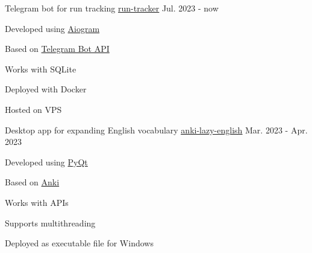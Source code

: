 
\begin{cventries}

  \cventry
  {Telegram bot for run tracking}
  {\href{https://github.com/ilev-sergey/run-tracker}{\underline{run-tracker}}}
  {}
  {Jul. 2023 - now}
  {
    \begin{cvitems}
      \item {Developed using \href{https://docs.aiogram.dev}{Aiogram}}
      \item {Based on \href{https://core.telegram.org/bots/api}{Telegram Bot API}}
      \item {Works with SQLite}
      \item {Deployed with Docker}
      \item {Hosted on VPS}
    \end{cvitems}
  }

  \cventry
  {Desktop app for expanding English vocabulary}
  {\href{https://github.com/ilev-sergey/anki-lazy-english}{\underline{anki-lazy-english}}}
  {}
  {Mar. 2023 - Apr. 2023}
  {
    \begin{cvitems}
      \item {Developed using \href{https://en.wikipedia.org/wiki/PyQt}{PyQt}}
      \item Based on {\href{https://en.wikipedia.org/wiki/Anki_(software)}{Anki}}
      \item {Works with APIs}
      \item {Supports multithreading}
      \item {Deployed as executable file for Windows}
    \end{cvitems}
  }

\end{cventries}
